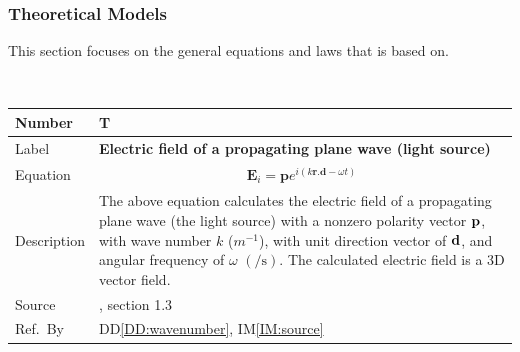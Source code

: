 \documentclass[12pt]{article}
\newcommand{\colBwidth}{0.82\textwidth} \newcommand{\colCwidth}{0.1\textwidth}
\begin{document}
	\subsubsection{Theoretical Models}\label{sec_theoretical}
	
	This section focuses on the general equations and laws that \progname{} is based
	on. %
	
	~\newline \noindent \begin{minipage}{\textwidth}
		\renewcommand*{\arraystretch}{1.5} \begin{tabular}{| p{\colAwidth} |
				p{\colBwidth}|} \hline \rowcolor[gray]{0.9} Number&
			T{theorynum}\thetheorynum \label{TM:source}\\ \hline Label&\bf
			Electric field of a propagating plane wave (light source) \\ \hline Equation&
			\begin{equation} \label{eq:planewave} \begin{gathered} \textbf{E}_{i}=
					\textbf{p} e^{ i ( k\textbf{r} . \textbf{d} - \omega t)} \end{gathered} 
			\end{equation} \\
			
			
			\hline Description & The above equation calculates the electric field of a
			propagating plane wave (the light source) with a nonzero polarity vector $\bf
			p$, with wave number $k$ ($m^{-1}$), with unit direction vector of $\bf d$,
			and angular frequency of $\omega$ $(\si{\per \second})$. The calculated
			electric field is a 3D vector field. \\ \hline Source &
			
			\cite{monk2003finite}, section 1.3 \\ %
			\hline Ref.\ By & DD\ref{DD:wavenumber}, IM\ref{IM:source} \\ \hline
	\end{tabular} \end{minipage}\\
	
	
\end{document}
